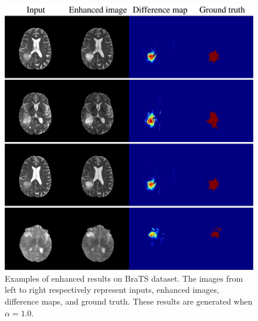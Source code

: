 \documentclass[journal,twoside,web]{ieeecolor}
\begin{document}
\begin{figure}
	\centering
	\includegraphics[width=\columnwidth]{./figs/enhance_examples.pdf}
	\caption{Examples of enhanced results on BraTS dataset. The images from left to right respectively represent inputs, enhanced images, difference maps, and ground truth. These results are generated when $\alpha=1.0$.}
	\label{fig5}
\end{figure}
\end{document}
